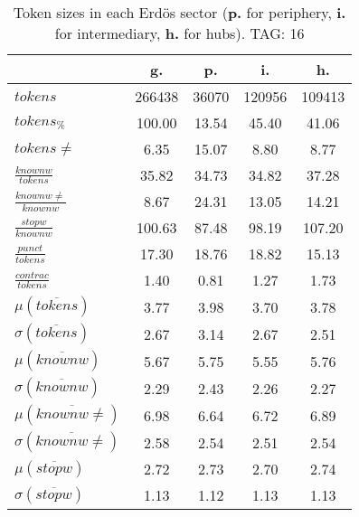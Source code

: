 \begin{table}[h!]
\begin{center}
\begin{tabular}{| l || c | c | c | c |}\hline
 & {\bf g.} & {\bf p.} & {\bf i.} & {\bf h.} \\\hline\hline
$tokens$ & 266438  & 36070  & 120956  & 109413 \\
$tokens_{\%}$ & 100.00  & 13.54  & 45.40  & 41.06 \\
$tokens \neq$ & 6.35  & 15.07  & 8.80  & 8.77 \\\hline
$\frac{knownw}{tokens}$ & 35.82  & 34.73  & 34.82  & 37.28 \\
$\frac{knownw \neq}{knownw}$ & 8.67  & 24.31  & 13.05  & 14.21 \\\hline
$\frac{stopw}{knownw}$ & 100.63  & 87.48  & 98.19  & 107.20 \\
$\frac{punct}{tokens}$ & 17.30  & 18.76  & 18.82  & 15.13 \\
$\frac{contrac}{tokens}$ & 1.40  & 0.81  & 1.27  & 1.73 \\\hline\hline
$\mu(\overline{tokens})$ & 3.77  & 3.98  & 3.70  & 3.78 \\
$\sigma(\overline{tokens})$ & 2.67  & 3.14  & 2.67  & 2.51 \\\hline
$\mu(\overline{knownw})$ & 5.67  & 5.75  & 5.55  & 5.76 \\
$\sigma(\overline{knownw})$ & 2.29  & 2.43  & 2.26  & 2.27 \\\hline
$\mu(\overline{knownw \neq})$ & 6.98  & 6.64  & 6.72  & 6.89 \\
$\sigma(\overline{knownw \neq})$ & 2.58  & 2.54  & 2.51  & 2.54 \\\hline
$\mu(\overline{stopw})$ & 2.72  & 2.73  & 2.70  & 2.74 \\
$\sigma(\overline{stopw})$ & 1.13  & 1.12  & 1.13  & 1.13 \\\hline
\end{tabular}
\caption{Token sizes in each Erd\"os sector ({{\bf p.}} for periphery, {{\bf i.}} for intermediary, {{\bf h.}} for hubs). TAG: 16}
\end{center}
\end{table}